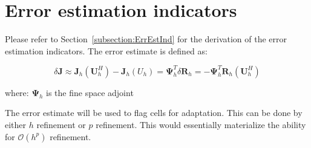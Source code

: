 \section{Error estimation indicators}

Please refer to Section~\ref{subsection:ErrEstInd} for the derivation of the error estimation indicators. The error estimate is defined as:\par

\begin{equation}
\delta \mathbf{J} \approx  \mathbf{J}_h(\mathbf{U}_h^H) - \mathbf{J}_h(U_h) = \mathbf{\Psi}_h^T \delta \mathbf{R}_h = -\mathbf{\Psi}_h^T \mathbf{R}_h(\mathbf{U}_h^H)
\end{equation}

where: $\mathbf{\Psi}_h$ is the fine space adjoint

The error estimate will be used to flag cells for adaptation. This can be done by either $h$ refinement or $p$ refinement. This would essentially materialize the ability for $\mathcal{O}(h^p)$ refinement.